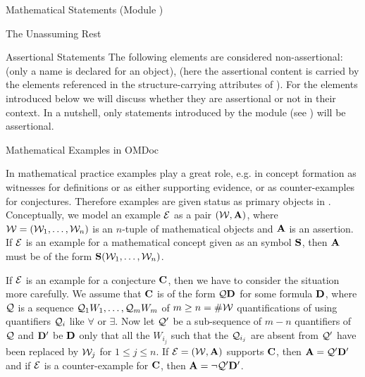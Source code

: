 \begin{tchapter}[id=statements,short=Mathematical Statements]{Mathematical Statements (Module {})}
\begin{tsection}[id=assertion]{The Unassuming Rest}
\begin{tsubsection}[id=assertional-statements,short=Assertional Statements]{Assertional Statements}
  The following elements are considered non-assertional: {} (only a name
  is declared for an object), {} (here the assertional content is
  carried by the {} elements referenced in the structure-carrying
  attributes of {}).  For the elements introduced below we will
  discuss whether they are assertional or not in their context. In a nutshell, only
  statements introduced by the module {} (see {}) will be
  assertional.
\end{tsubsection}           
\end{tsection}

\begin{tsection}[id=examples]{Mathematical Examples in OMDoc}

  In mathematical practice examples play a great role, e.g. in concept formation as
  witnesses for definitions or as either supporting evidence, or as counter-examples for
  conjectures.  Therefore examples are given status as primary objects in {\omdoc}.
  Conceptually, we model an example ${\cal E}$ as a pair $({\cal W},{\bf A})$, where
  ${\cal W}=({\cal W}_1,\ldots,{\cal W}_n)$ is an $n$-tuple of mathematical objects and ${\bf A}$ is an
  assertion. If ${\cal E}$ is an example for a mathematical concept given as an {\omdoc} symbol
  ${\bf S}$, then ${\bf A}$ must be of the form ${\bf S}({\cal W}_1,\ldots,{\cal W}_n)$.
  
  If ${\cal E}$ is an example for a conjecture ${\bf C}$, then we have to consider the situation
  more carefully. We assume that ${\bf C}$ is of the form ${\cal Q}{\bf D}$ for some formula ${\bf D}$,
  where ${\cal Q}$ is a sequence ${\cal Q}_1W_1,\ldots,{\cal Q}_mW_m$ of $m\geq n=\#{\cal W}$ quantifications
  of using quantifiers ${\cal Q}_i$ like $\forall$ or $\exists$.  Now let ${\cal Q}'$ be a
  sub-sequence of $m-n$ quantifiers of ${\cal Q}$ and ${\bf D}'$ be ${\bf D}$ only that all the
  $W_{i_j}$ such that the ${\cal Q}_{i_j}$ are absent from ${\cal Q}'$ have been replaced by ${\cal W}_j$
  for $1\leq j\leq n$.  If ${\cal E}=({\cal W},{\bf A})$ supports ${\bf C}$, then ${\bf A}={\cal Q}'{\bf D}'$ and if
  ${\cal E}$ is a counter-example for ${\bf C}$, then ${\bf A}=\neg{\cal Q}'{\bf D}'$.
  

\end{tsection}
\end{tchapter}
